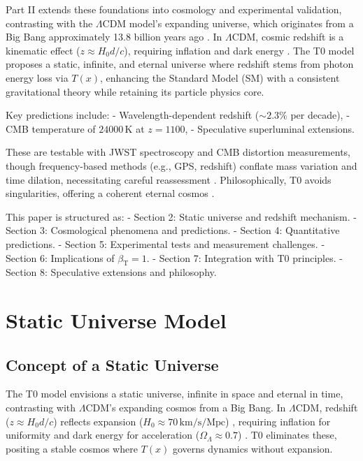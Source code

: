 \documentclass[12pt,a4paper]{article}
\newcommand{\Tfield}{T(x)}
\newcommand{\betaT}{\beta_{\text{T}}}
\begin{document}
	Part II extends these foundations into cosmology and experimental validation, contrasting with the \(\Lambda\)CDM model’s expanding universe, which originates from a Big Bang approximately 13.8 billion years ago \cite{Planck2020}. In \(\Lambda\)CDM, cosmic redshift is a kinematic effect (\(z \approx H_0 d / c\)), requiring inflation and dark energy \cite{Riess1998,Perlmutter1999}. The T0 model proposes a static, infinite, and eternal universe where redshift stems from photon energy loss via \(\Tfield\), enhancing the Standard Model (SM) with a consistent gravitational theory while retaining its particle physics core.
	
	Key predictions include:
	- Wavelength-dependent redshift (\(\sim 2.3\%\) per decade),
	- CMB temperature of \(24000 \, \text{K}\) at \(z = 1100\),
	- Speculative superluminal extensions.
	
	These are testable with JWST spectroscopy and CMB distortion measurements, though frequency-based methods (e.g., GPS, redshift) conflate mass variation and time dilation, necessitating careful reassessment \cite{pascher_quantum_2025}. Philosophically, T0 avoids singularities, offering a coherent eternal cosmos \cite{pascher_perspective_2025}.
	
	This paper is structured as:
	- Section 2: Static universe and redshift mechanism.
	- Section 3: Cosmological phenomena and predictions.
	- Section 4: Quantitative predictions.
	- Section 5: Experimental tests and measurement challenges.
	- Section 6: Implications of \(\betaT = 1\).
	- Section 7: Integration with T0 principles.
	- Section 8: Speculative extensions and philosophy.
	
	\section{Static Universe Model}
	\label{sec:static_universe}
	
	\subsection{Concept of a Static Universe}
	\label{subsec:static_concept}
	
	The T0 model envisions a static universe, infinite in space and eternal in time, contrasting with \(\Lambda\)CDM’s expanding cosmos from a Big Bang. In \(\Lambda\)CDM, redshift (\(z \approx H_0 d / c\)) reflects expansion (\(H_0 \approx 70 \, \text{km/s/Mpc}\)) \cite{Planck2020}, requiring inflation for uniformity and dark energy for acceleration (\(\Omega_{\Lambda} \approx 0.7\)) \cite{Riess1998}. T0 eliminates these, positing a stable cosmos where \(\Tfield\) governs dynamics without expansion.
	
\end{document}
